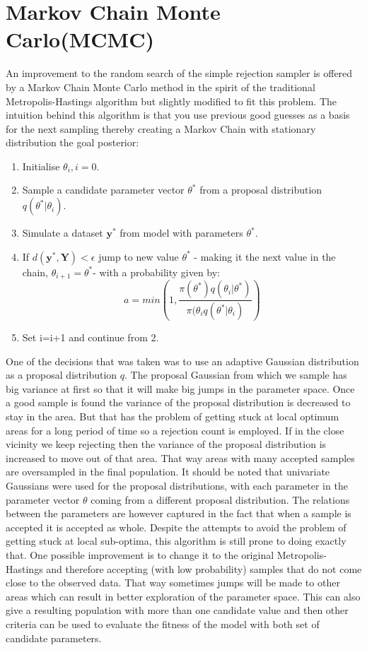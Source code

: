 \section{Markov Chain Monte Carlo(MCMC)}
An improvement to the random search of the simple rejection sampler is offered by a Markov Chain Monte Carlo method in the spirit of the traditional Metropolis-Hastings algorithm but slightly modified to fit this problem\cite[] {marjoram2003markov}. The intuition behind this algorithm is that you use previous good guesses as a basis for the next sampling thereby creating a Markov Chain with stationary distribution the goal posterior:
\begin{enumerate}[noitemsep]
\item{Initialise $\theta_{i}, i = 0$.}
\item{Sample a candidate parameter vector $\theta^*$ from a proposal distribution $q(\theta^* | \theta_{i})$.}
\item{Simulate a dataset $\mathbf{y}^*$ from model with parameters $\theta^*$.}
\item{If $d(\mathbf{y}^*, \mathbf{Y}) < \epsilon$ jump to new value $\theta^*$ - making it the next value in the chain, $\theta_{i+1} = \theta^*$- with a probability given by:
\begin{equation}
a = min \left(1, \frac{\pi(\theta^*)q(\theta_{i} | \theta^*)}{\pi(\theta_{i}q(\theta^*|\theta_{i})}\right)
\end{equation}}
\item{Set i=i+1 and continue from 2.}
\end{enumerate}
One of the decisions that was taken was to use an adaptive Gaussian distribution as a proposal distribution $q$. The proposal Gaussian from which we sample has big variance at first so that it will make big jumps in the parameter space. Once a good sample is found the variance of the proposal distribution is decreased to stay in the area. But that has the problem of getting stuck at local optimum areas for a long period of time so a rejection count is employed. If in the close vicinity we keep rejecting then the variance of the proposal distribution is increased to move out of that area. That way areas with many accepted samples are oversampled in the final population. It should be noted that univariate Gaussians were used for the proposal distributions, with each parameter in the parameter vector $\theta$ coming from a different proposal distribution. The relations between the parameters are however captured in the fact that when a sample is accepted it is accepted as whole. Despite the attempts to avoid the problem of getting stuck at local sub-optima, this algorithm is still prone to doing exactly that. One possible improvement is to change it to the original Metropolis-Hastings and therefore accepting (with low probability) samples that do not come close to the observed data. That way sometimes jumps will be made to other areas which can result in better exploration of the parameter space. This can also give a resulting population with more than one candidate value and then other criteria can be used to evaluate the fitness of the model with both set of candidate parameters. 
